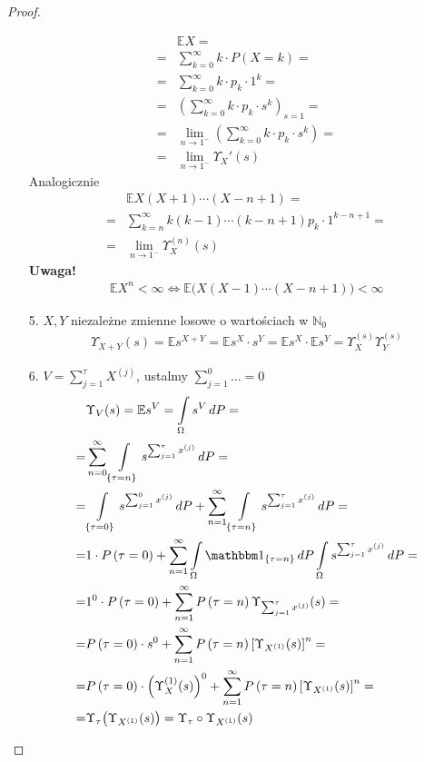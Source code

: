 \begin{proof}
\begin{itemize}
\begin{align*}
&\mathbb E X
=\\=&
\sum_{k=0}^{\infty }k\cdot P\left(X=k\right)
=\\=&
\sum_{k=0}^{\infty }k\cdot p_k\cdot 1^k
=\\=&
\left(\sum_{k=0}^{\infty }k\cdot p_k\cdot s^k\right)_{s=1}
=\\=&
\lim\limits_{n\to1^-} \left(\sum_{k=0}^{\infty }k\cdot p_k\cdot s^k\right)
=\\=&
  \lim\limits_{n\to1^-} \Upsilon_X'(s)
\end{align*}
Analogicznie
\begin{align*}
&\mathbb E X(X+1)\cdots(X-n+1)
=\\=&
\sum_{k=n}^{\infty }k(k-1)\cdots(k-n+1)p_k\cdot 1^{k-n+1}
=\\=&
\lim\limits_{n\to1^-} \Upsilon_X^{(n)}(s)
\end{align*}
\textbf{Uwaga!}\\
\begin{gather*}
\mathbb E X^n<\infty \Leftrightarrow\mathbb E \bigl(X(X-1)\cdots(X-n+1)\bigr)<\infty 
\end{gather*}
\item [5.]
$ X,Y $ niezależne zmienne losowe o wartościach w $ \mathbb N _0 $
\begin{gather*}
\Upsilon_{X+Y}(s)
=
\mathbb E s^{X+Y}
=
\mathbb E s^X\cdot s^Y
=
\mathbb E s^X\cdot \mathbb E s^Y
=
\Upsilon_X^{(s)}\Upsilon_Y^{(s)}
\end{gather*}
\item [6.] $ V=\sum_{j=1}^{\tau}X^{(j)} $, ustalmy $ \sum_{j=1}^{0}\dots=0 $
\begin{align*}
&\Upsilon_V(s)=\mathbb E s^V
=
\int\limits_{\Omega}s^V\,dP
=\\=&
\sum_{n=0}^{\infty }\int\limits_{\left\{\tau=n\right\}}s^{\sum_{j=1}^{\tau}x^{(j)}}\,dP
=\\=&
\int\limits_{\left\{\tau=0\right\}}s^{\sum_{j=1}^{0}x^{(j)}}\,dP+
\sum_{n=1}^{\infty }\int\limits_{\left\{\tau=n\right\}}s^{\sum_{j=1}^{\tau}x^{(j)}}\,dP
=\\=&
1\cdot P\left(\tau=0\right)+
\sum_{n=1}^{\infty }
\int\limits_{\Omega}\mathbbm1_{\left\{\tau=n\right\}}\,dP\int\limits_{\Omega}s^{\sum_{j=1}^{\tau}x^{(j)}}\,dP
=\\=&
1^0\cdot P\left(\tau=0\right)+\sum_{n=1}^{\infty }P\left(\tau=n\right)\Upsilon_{\sum_{j=1}^{\tau}x^{(j)}}(s)
=\\=&
P\left(\tau=0\right)\cdot s^0+\sum_{n=1}^{\infty }P\left(\tau=n\right)\left[\Upsilon_{X^{(1)}}(s)\right]^n
=\\=&
P\left(\tau=0\right)\cdot \left(\Upsilon_X^{(1)}(s)\right)^0+\sum_{n=1}^{\infty }P\left(\tau=n\right)\left[\Upsilon_{X^{(1)}}(s)\right]^n
=\\=&
\Upsilon_\tau \bigl(\Upsilon_{X^{(1)}}(s)\bigr)
=
\Upsilon_\tau \circ \Upsilon_{X^{(1)}}(s)
\end{align*}
\end{itemize}
\end{proof}
